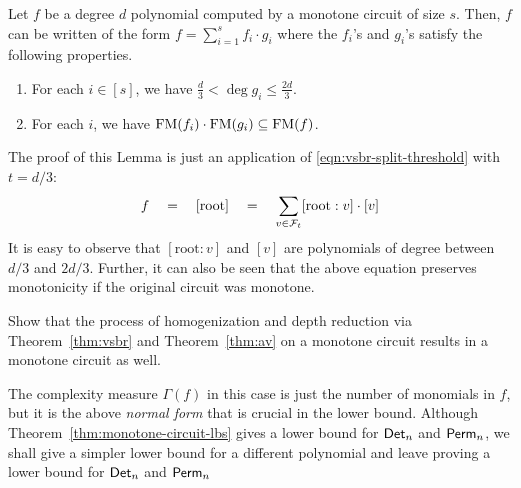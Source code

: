 \begin{lemma}\label{lem:vsbr-two-thirds}
  Let $f$ be a degree $d$ polynomial computed by a monotone circuit of size $s$. Then, $f$ can be written of the form $f = \sum_{i=1}^s f_i \cdot g_i$ where the $f_i$'s and $g_i$'s satisfy the following properties.
\begin{enumerate}
\item For each $i\in [s]$, we have $\frac{d}{3} < \deg{g_i} \leq
  \frac{2d}{3}$.
\item For each $i$, we have $\mathrm{FM}(f_i)\cdot \mathrm{FM}(g_i) \subseteq \mathrm{FM}(f)$.
\end{enumerate}
\end{lemma}
\begin{proof-sketch}
The proof of this Lemma is just an application of \eqref{eqn:vsbr-split-threshold} with $t = d/3$: 
\[
f\quad = \quad [\mathrm{root}] \quad = \quad \sum_{v\in \mathcal{F}_t} [\mathrm{root}:v] \cdot [v]
\]
It is easy to observe that $[\mathrm{root}:v]$ and $[v]$ are polynomials of degree between $d/3$ and $2d/3$. Further, it can also be seen that the above equation  preserves monotonicity if the original circuit was monotone. 
\end{proof-sketch}

\begin{exercise}
Show that the process of homogenization and depth reduction via Theorem~\ref{thm:vsbr} and Theorem~\ref{thm:av} on a monotone circuit results in a  monotone circuit as well. 
\end{exercise}


The complexity measure $\Gamma(f)$ in this case is just the number of monomials in $f$, but it is the above \emph{normal form} that is crucial in the lower bound. Although Theorem~\ref{thm:monotone-circuit-lbs} gives a lower bound for $\mathsf{Det}_n$ and $\mathsf{Perm}_n$, we shall give a simpler lower bound for a different polynomial and leave proving a lower bound for $\mathsf{Det}_n$ and $\mathsf{Perm}_n$ 


